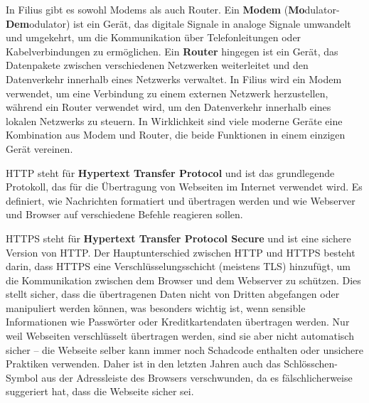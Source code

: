 \begin{myremark}
	In Filius gibt es sowohl Modems als auch Router. Ein \textbf{Modem} (\textbf{Mo}dulator-\textbf{Dem}odulator) ist ein Gerät, das digitale Signale in analoge Signale umwandelt und umgekehrt, um die Kommunikation über Telefonleitungen oder Kabelverbindungen zu ermöglichen. Ein \textbf{Router} hingegen ist ein Gerät, das Datenpakete zwischen verschiedenen Netzwerken weiterleitet und den Datenverkehr innerhalb eines Netzwerks verwaltet. In Filius wird ein Modem verwendet, um eine Verbindung zu einem externen Netzwerk herzustellen, während ein Router verwendet wird, um den Datenverkehr innerhalb eines lokalen Netzwerks zu steuern. In Wirklichkeit sind viele moderne Geräte eine Kombination aus Modem und Router, die beide Funktionen in einem einzigen Gerät vereinen.
\end{myremark}

\begin{myremark}
	\gls{HTTP} steht für \textbf{Hypertext Transfer Protocol} und ist das grundlegende Protokoll, das für die Übertragung von Webseiten im Internet verwendet wird. Es definiert, wie Nachrichten formatiert und übertragen werden und wie Webserver und Browser auf verschiedene Befehle reagieren sollen.

	\gls{HTTPS} steht für \textbf{Hypertext Transfer Protocol Secure} und ist eine sichere Version von \gls{HTTP}. Der Hauptunterschied zwischen \gls{HTTP} und \gls{HTTPS} besteht darin, dass \gls{HTTPS} eine Verschlüsselungsschicht (meistens \gls{TLS}) hinzufügt, um die Kommunikation zwischen dem Browser und dem Webserver zu schützen. Dies stellt sicher, dass die übertragenen Daten nicht von Dritten abgefangen oder manipuliert werden können, was besonders wichtig ist, wenn sensible Informationen wie Passwörter oder Kreditkartendaten übertragen werden. Nur weil Webseiten verschlüsselt übertragen werden, sind sie aber nicht automatisch sicher -- die Webseite selber kann immer noch Schadcode enthalten oder unsichere Praktiken verwenden. Daher ist in den letzten Jahren auch das Schlösschen-Symbol aus der Adressleiste des Browsers verschwunden, da es fälschlicherweise suggeriert hat, dass die Webseite sicher sei.
\end{myremark}

